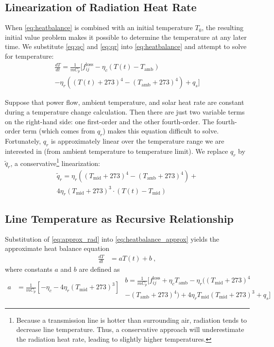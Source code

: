 \documentclass[journal,twoside]{IEEEtran}
\begin{document}
\subsection{Linearization of Radiation Heat Rate}
When \eqref{eq:heatbalance} is combined with an initial temperature $T_0$, the resulting initial value problem makes it possible to determine the temperature at any later time. We substitute \eqref{eq:qc} and \eqref{eq:qr} into \eqref{eq:heatbalance} and attempt to solve for temperature:
\begin{multline}\label{eq:heatbalance_approx}
\frac{dT}{dt} = \frac{1}{mC_p}\big[ f_{ij}^\text{loss} - \eta_c\left( T(t) - T_\text{amb}\right) \\ - \eta_r\left((T(t) + 273)^4 - (T_\text{amb} + 273)^4\right) + q_s \big]
\end{multline}

Suppose that power flow, ambient temperature, and solar heat rate are constant during a temperature change calculation. Then there are just two variable terms on the right-hand side: one first-order and the other fourth-order. The fourth-order term (which comes from $q_r$) makes this equation difficult to solve. Fortunately, $q_r$ is approximately linear over the temperature range we are interested in (from ambient temperature to temperature limit). We replace $q_r$ by $\tilde{q}_r$, a conservative\footnote{Because a transmission line is hotter than surrounding air, radiation tends to decrease line temperature. Thus, a conservative approach will underestimate the radiation heat rate, leading to slightly higher temperatures.} linearization:
\begin{multline}\label{eq:approx_rad}
\tilde{q}_r = \eta_r  \left( (T_\text{mid} + 273)^4 - (T_\text{amb} + 273)^4\right) + \\ 4\eta_r(T_\text{mid} + 273)^3\cdot(T(t) - T_\text{mid})
\end{multline}

\subsection{Line Temperature as Recursive Relationship}
Substitution of \eqref{eq:approx_rad} into \eqref{eq:heatbalance_approx} yields the approximate heat balance equation
\begin{align}\label{eq:diffeq}
\frac{dT}{dt} &= aT(t) + b~,
\end{align}
where constants $a$ and $b$ are defined as
\begin{subequations}
\begin{align}
a &= \frac{1}{mC_p} \left[ -\eta_c - 4\eta_r(T_\text{mid} + 273)^3 \right]
\end{align}
\begin{multline}
b = \frac{1}{mC_p} \big[ f_{ij}^\text{loss} + \eta_cT_\text{amb} - \eta_r \big( (T_\text{mid} + 273)^4 \\ - (T_\text{amb} + 273)^4 \big) + 4\eta_rT_\text{mid}(T_\text{mid} + 273)^3 + q_s \big]
\end{multline}
\end{subequations}
\end{document}
